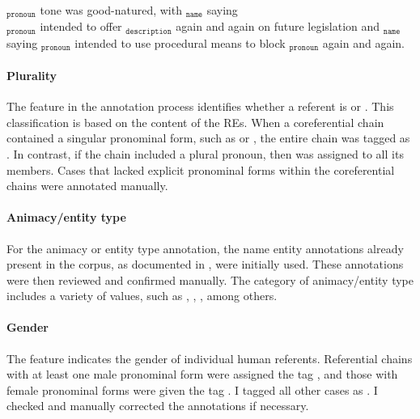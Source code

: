 \begin{exe}
	\ex\label{ex:reform}
	$_{\texttt{pronoun}}$ tone was good-natured, with $_{\texttt{name}}$ saying\\ $_{\texttt{pronoun}}$ intended to offer $_{\texttt{description}}$ again and again on future legislation and $_{\texttt{name}}$ saying $_{\texttt{pronoun}}$ intended to use procedural means to block $_{\texttt{pronoun}}$ again and again.
\end{exe}

\paragraph*{Plurality} The  feature in the annotation process identifies whether a referent is  or . This classification is based on the content of the REs. When a coreferential chain contained a singular pronominal form, such as  or , the entire chain was tagged as . In contrast, if the chain included a plural pronoun, then  was assigned to all its members. Cases that lacked explicit pronominal forms within the coreferential chains were annotated manually.

\paragraph*{Animacy/entity type} 

For the animacy or entity type annotation, the name entity annotations already present in the corpus, as documented in \citep[21]{weischedel2012ontonotes}, were initially used. These annotations were then reviewed and confirmed manually. The category of animacy/entity type includes a variety of values, such as , , , among others.

\paragraph*{Gender} The feature  indicates the gender of individual human referents. Referential chains with at least one male pronominal form were assigned the tag , and those with female pronominal forms were given the tag . I tagged all other cases as . I checked and manually corrected the annotations if necessary.


